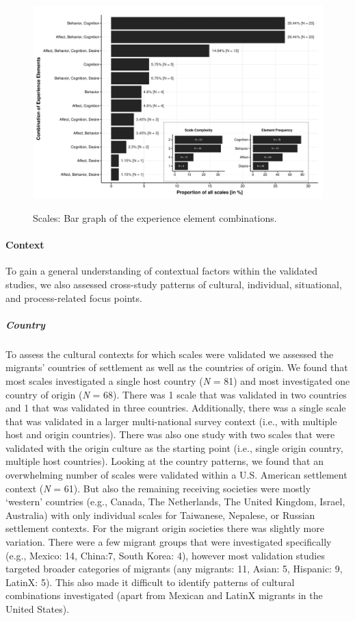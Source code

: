 \begin{figure}[h]
\centering
\caption{Scales: Bar graph of the experience element combinations.}
\includegraphics[width=\textwidth]{Figures/ABCDFreq-1}
\label{fig:ElementsScales}
\end{figure}



\paragraph{Context}

To gain a general understanding of contextual factors within the
validated studies, we also assessed cross-study patterns of cultural,
individual, situational, and process-related focus points.

\subparagraph{Country}

To assess the cultural contexts for which scales were validated we
assessed the migrants' countries of settlement as well as the countries
of origin. We found that most scales investigated a single host country
(\textit{N} = 81) and most investigated one country of origin
(\textit{N} = 68). There was 1 scale that was validated in two countries
and 1 that was validated in three countries. Additionally, there was a
single scale that was validated in a larger multi-national survey
context (i.e., with multiple host and origin countries). There was also
one study with two scales that were validated with the origin culture as
the starting point (i.e., single origin country, multiple host
countries). Looking at the country patterns, we found that an
overwhelming number of scales were validated within a U.S. American
settlement context (\textit{N} = 61). But also the remaining receiving
societies were mostly `western' countries (e.g., Canada, The
Netherlands, The United Kingdom, Israel, Australia) with only individual
scales for Taiwanese, Nepalese, or Russian settlement contexts. For the
migrant origin societies there was slightly more variation. There were a
few migrant groups that were investigated specifically (e.g., Mexico:
14, China:7, South Korea: 4), however most validation studies targeted
broader categories of migrants (any migrants: 11, Asian: 5, Hispanic: 9,
LatinX: 5). This also made it difficult to identify patterns of cultural
combinations investigated (apart from Mexican and LatinX migrants in the
United States).

